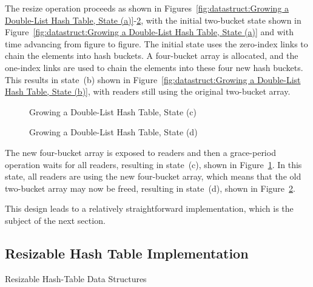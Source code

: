 The resize operation proceeds as shown in
Figures~\ref{fig:datastruct:Growing a Double-List Hash Table, State (a)}-\ref{fig:datastruct:Growing a Double-List Hash Table, State (d)},
with the initial two-bucket state shown in
Figure~\ref{fig:datastruct:Growing a Double-List Hash Table, State (a)}
and with time advancing from figure to figure.
The initial state uses the zero-index links to chain the elements into
hash buckets.
A four-bucket array is allocated, and the one-index links are used to
chain the elements into these four new hash buckets.
This results in state~(b) shown in
Figure~\ref{fig:datastruct:Growing a Double-List Hash Table, State (b)},
with readers still using the original two-bucket array.

\begin{figure}[tb]
\centering
{}
\caption{Growing a Double-List Hash Table, State (c)}
\label{fig:datastruct:Growing a Double-List Hash Table, State (c)}
\end{figure}

\begin{figure}[tb]
\centering
{}
\caption{Growing a Double-List Hash Table, State (d)}
\label{fig:datastruct:Growing a Double-List Hash Table, State (d)}
\end{figure}

The new four-bucket array is exposed to readers and then a grace-period
operation waits for all readers, resulting in state~(c), shown in
Figure~\ref{fig:datastruct:Growing a Double-List Hash Table, State (c)}.
In this state, all readers are using the new four-bucket array,
which means that the old two-bucket array may now be freed, resulting
in state~(d), shown in
Figure~\ref{fig:datastruct:Growing a Double-List Hash Table, State (d)}.

This design leads to a relatively straightforward implementation,
which is the subject of the next section.

\subsection{Resizable Hash Table Implementation}
\label{sec:datastruct:Resizable Hash Table Implementation}

\begin{listing}[tb]

\caption{Resizable Hash-Table Data Structures}
\label{lst:datastruct:Resizable Hash-Table Data Structures}
\end{listing}

